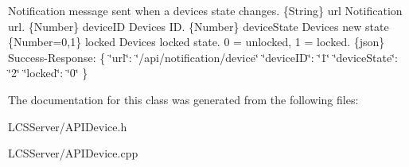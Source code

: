 Notification message sent when a device\textquotesingle{}s state changes.  \{String\} url Notification url.  \{Number\} device\+ID Device\textquotesingle{}s ID.  \{Number\} device\+State Device\textquotesingle{}s new state  \{Number=0,1\} locked Device\textquotesingle{}s locked state. 0 = unlocked, 1 = locked.  \{json\} Success-\/\+Response\+: \{ \char`\"{}url\char`\"{}\+: \char`\"{}/api/notification/device\char`\"{} \char`\"{}device\+I\+D\char`\"{}\+: \char`\"{}1\char`\"{} \char`\"{}device\+State\char`\"{}\+: \char`\"{}2\char`\"{} \char`\"{}locked\char`\"{}\+: \char`\"{}0\char`\"{} \} 

The documentation for this class was generated from the following files\+:\begin{DoxyCompactItemize}
\item 
L\+C\+S\+Server/A\+P\+I\+Device.\+h\item 
L\+C\+S\+Server/A\+P\+I\+Device.\+cpp\end{DoxyCompactItemize}
